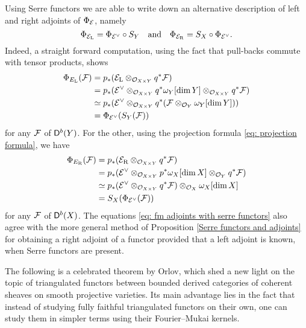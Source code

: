 \begin{remark}
    \label{another description of adjoints of FM}
    Using Serre functors we are able to write down an alternative description of left and right adjoints of $\Phi_{\mathcal E}$, namely
    \begin{equation}
        \label{eq: fm adjoints with serre functors}
        \Phi_{\mathcal E_\mathrm{L}} = \Phi_{\mathcal E^\vee} \circ S_Y \quad \text{and} \quad 
        \Phi_{\mathcal E_\mathrm{R}} = S_X \circ \Phi_{\mathcal E^\vee}.
    \end{equation}
    Indeed, a straight forward computation, using the fact that pull-backs commute with tensor products, shows
    \begin{align*}
        \Phi_{E_\mathrm{L}}(\mathcal F) &= p_*(\mathcal E_\mathrm{L} \otimes_{{\mathcal{O}_{X \times Y}}} q^*\mathcal F) \\
        &= p_*(\mathcal E^\vee \otimes_{{\mathcal{O}_{X \times Y}}} q^*\omega_Y[\dim Y] \otimes_{{\mathcal{O}_{X \times Y}}} q^*\mathcal F) \\
        &\simeq p_*(\mathcal E^\vee \otimes_{{\mathcal{O}_{X \times Y}}} q^*(\mathcal F \otimes_{{\mathcal{O}_{Y}}} \omega_Y[\dim Y])) \\
        &= \Phi_{\mathcal E^\vee}(S_Y(\mathcal F))
    \end{align*}
    for any $\mathcal F$ of $\mathsf{D}^b(Y)$. For the other, using the projection formula \eqref{eq: projection formula}, we have
    \begin{align*}
        \Phi_{E_\mathrm{R}}(\mathcal F) &= p_*(\mathcal E_\mathrm{R} \otimes_{{\mathcal{O}_{X \times Y}}} q^*\mathcal F) \\
        &= p_*(\mathcal E^\vee \otimes_{{\mathcal{O}_{X \times Y}}} p^*\omega_X[\dim X] \otimes_{{\mathcal{O}_{Y}}} q^*\mathcal F) \\
        & \simeq p_*(\mathcal E^\vee \otimes_{{\mathcal{O}_{X \times Y}}} q^*\mathcal F) \otimes_{\mathcal{O}_{X}} \omega_X[\dim X] \\
        &= S_X(\Phi_{\mathcal E^\vee}(\mathcal F))
    \end{align*}
    for any $\mathcal F$ of $\mathsf{D}^b(X)$. The equations \eqref{eq: fm adjoints with serre functors} also agree with the more general method of Proposition \ref{Serre functors and adjoints} for obtaining a right adjoint of a functor provided that a left adjoint is known, when Serre functors are present.
\end{remark}

The following is a celebrated theorem by Orlov, which shed a new light on the topic of triangulated functors between bounded derived categories of coherent sheaves on smooth projective varieties. Its main advantage lies in the fact that instead of studying fully faithful triangulated functors on their own, one can study them in simpler terms using their Fourier--Mukai kernels. 

